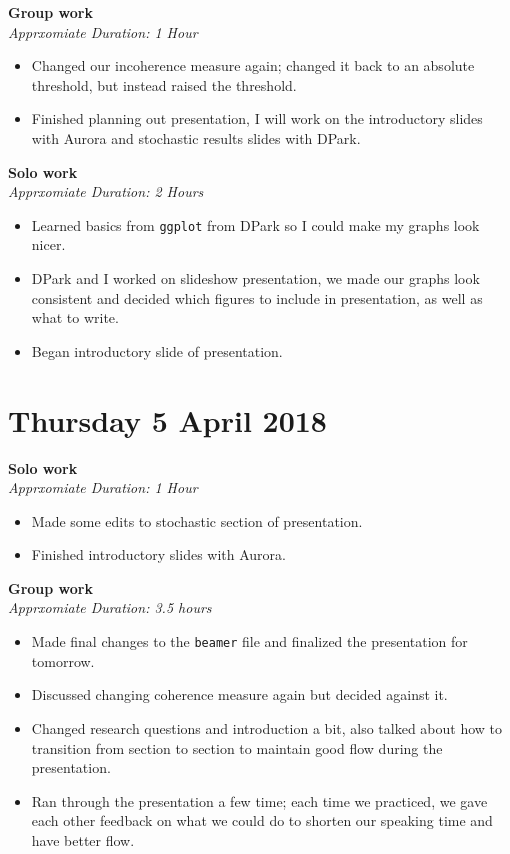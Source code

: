 \documentclass[12pt]{article}\usepackage[]{graphicx}\usepackage[]{color}
\begin{document}
\textbf{Group work} \\
\emph{Apprxomiate Duration: 1 Hour}
\begin{itemize}
\item Changed our incoherence measure again; changed it back to an absolute threshold, but instead raised the threshold.
\item Finished planning out presentation, I will work on the introductory slides with Aurora and stochastic results slides with DPark.
\end{itemize}

\textbf{Solo work} \\
\emph{Apprxomiate Duration: 2 Hours}
\begin{itemize}
\item Learned basics from \texttt{ggplot} from DPark so I could make my graphs look nicer.
\item DPark and I worked on slideshow presentation, we made our graphs look consistent and decided which figures to include in presentation, as well as what to write.
\item Began introductory slide of presentation.
\end{itemize}

\section*{Thursday 5 April 2018}

\textbf{Solo work} \\
\emph{Apprxomiate Duration: 1 Hour}
\begin{itemize}
\item Made some edits to stochastic section of presentation.
\item Finished introductory slides with Aurora.
\end{itemize}

\textbf{Group work} \\
\emph{Apprxomiate Duration: 3.5 hours}
\begin{itemize}
\item Made final changes to the \texttt{beamer} file and finalized the presentation for tomorrow.
\item Discussed changing coherence measure again but decided against it.
\item Changed research questions and introduction a bit, also talked about how to transition from section to section to maintain good flow during the presentation.
\item Ran through the presentation a few time; each time we practiced, we gave each other feedback on what we could do to shorten our speaking time and have better flow.
\end{itemize}
\end{document}
